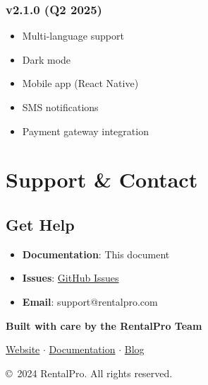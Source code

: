 \documentclass[12pt,a4paper]{article}
\begin{document}
\subsubsection{v2.1.0 (Q2 2025)}
\begin{itemize}
    \item Multi-language support
    \item Dark mode
    \item Mobile app (React Native)
    \item SMS notifications
    \item Payment gateway integration
\end{itemize}

\section{Support \& Contact}

\subsection{Get Help}

\begin{itemize}
    \item \textbf{Documentation}: This document
    \item \textbf{Issues}: \href{https://github.com/yourusername/car-rental-sys/issues}{GitHub Issues}
    \item \textbf{Email}: support@rentalpro.com
\end{itemize}

\vspace{1cm}

\begin{center}
\large
\textbf{Built with care by the RentalPro Team}

\href{https://rentalpro.com}{Website} $\cdot$ \href{https://docs.rentalpro.com}{Documentation} $\cdot$ \href{https://blog.rentalpro.com}{Blog}

\vspace{0.5cm}

\copyright~2024 RentalPro. All rights reserved.
\end{center}
\end{document}
